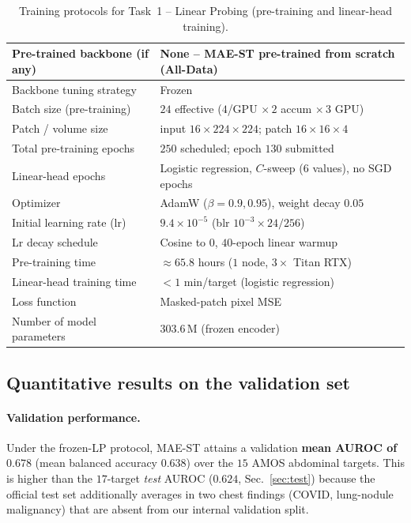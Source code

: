 \documentclass[runningheads]{llncs}
\begin{document}
\begin{table}[!htbp]
\caption{Training protocols for Task~1 -- Linear Probing (pre-training and
linear-head training).}
\label{table:training-lp}
\begin{center}
\begin{tabular}{ll}
\hline
Pre-trained backbone (if any)   & None -- MAE-ST pre-trained from scratch (All-Data) \\ \hline
Backbone tuning strategy        & Frozen \\ \hline
Batch size (pre-training)       & $24$ effective ($4$/GPU $\times\,2$ accum $\times\,3$ GPU) \\ \hline
Patch / volume size             & input $16\times224\times224$; patch $16\times16\times4$ \\ \hline
Total pre-training epochs       & $250$ scheduled; epoch $130$ submitted \\ \hline
Linear-head epochs              & Logistic regression, $C$-sweep (6 values), no SGD epochs \\ \hline
Optimizer                       & AdamW ($\beta=0.9,0.95$), weight decay $0.05$ \\ \hline
Initial learning rate (lr)      & $9.4\times10^{-5}$ (blr $10^{-3}\times24/256$) \\ \hline
Lr decay schedule               & Cosine to $0$, $40$-epoch linear warmup \\ \hline
Pre-training time               & $\approx 65.8$ hours ($1$ node, $3\times$ Titan RTX) \\ \hline
Linear-head training time       & $<1$ min/target (logistic regression) \\ \hline
Loss function                   & Masked-patch pixel MSE \\ \hline
Number of model parameters      & $303.6$\,M (frozen encoder) \\ \hline
\end{tabular}
\end{center}
\end{table}

\subsection{Quantitative results on the validation set}

\paragraph{Validation performance.}
Under the frozen-LP protocol, MAE-ST attains a validation \textbf{mean AUROC of
$0.678$} (mean balanced accuracy $0.638$) over the $15$ AMOS abdominal targets.
This is higher than the $17$-target \emph{test} AUROC ($0.624$,
Sec.~\ref{sec:test}) because the official test set additionally averages in two
chest findings (COVID, lung-nodule malignancy) that are absent from our internal
validation split.
\end{document}
